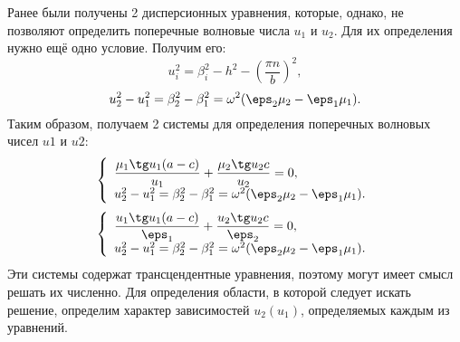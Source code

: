 \documentclass[12pt]{hedsemwork}
\renewcommand{\frac}{\dfrac}
\begin{document}
\begin{appendix}
Ранее были получены 2 дисперсионных уравнения, которые, однако, не позволяют
определить поперечные волновые числа \( u_1 \) и \( u_2 \). Для их определения
нужно ещё одно условие. Получим его:
\[
    u_i^2 = \beta_i^2 - h^2 - \left(\frac{\pi n}{b}\right)^2,
\]
\[
    u_2^2 - u_1^2 = \beta_2^2 - \beta_1^2 = \omega^2(\eps_2\mu_2 - \eps_1\mu_1).
\]
Таким образом, получаем 2 системы для определения поперечных волновых чисел
\( u1 \) и \( u2 \):
\[
    \left\{
        \begin{array}{l}
            \frac{\mu_1\tg u_1 (a-c)}{u_1} + \frac{\mu_2\tg u_2 c}{u_2} = 0,\\
            u_2^2 - u_1^2 = \beta_2^2 - \beta_1^2 =
            \omega^2(\eps_2\mu_2 - \eps_1\mu_1).
        \end{array}
    \right.
\]
\[
    \left\{
        \begin{array}{l}
            \frac{u_1\tg u_1 (a-c)}{\eps_1} + \frac{u_2\tg u_2 c}{\eps_2} = 0,\\
            u_2^2 - u_1^2 = \beta_2^2 - \beta_1^2 =
            \omega^2(\eps_2\mu_2 - \eps_1\mu_1).
        \end{array}
    \right.
\]
Эти системы содержат трансцендентные уравнения, поэтому могут имеет смысл
решать их численно. Для определения области, в которой следует искать решение,
определим характер зависимостей \( u_2(u_1) \), определяемых каждым из уравнений.


\end{appendix}
\end{document}
